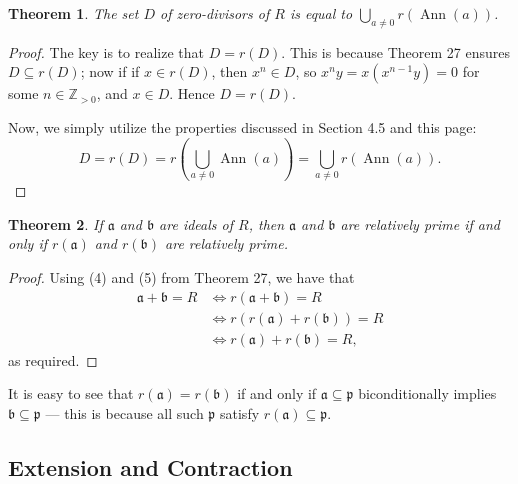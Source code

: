 \documentclass[11pt]{article}
\newtheorem{theorem}{Theorem}
\newcommand{\Ann}{\operatorname{Ann}}
\begin{document}
\begin{adjustwidth}{0.5cm}{}
	\begin{theorem}
		The set $D$ of zero-divisors of $R$ is equal to $\bigcup\limits_{a \ne 0} r(\Ann (a))$.
	\end{theorem}
	\begin{proof}
		The key is to realize that $D = r(D)$. This is because Theorem 27 ensures $D \subseteq r(D)$; now if if $x \in r(D)$, then $x^{n} \in D$, so $x^{n}y = x(x^{n - 1}y) = 0$ for some $n \in \mathbb{Z}_{> 0}$, and $x \in D$. Hence $D = r(D)$.

		Now, we simply utilize the properties discussed in Section 4.5 and this page:
		\[
			D = r(D) = r \left( \bigcup\limits_{a \ne 0} \Ann (a) \right) = \bigcup\limits_{a \ne 0} r (\Ann (a)).
		\]
	\end{proof}
\end{adjustwidth}

\begin{adjustwidth}{0.5cm}{}
	\begin{theorem}
		If $\mathfrak{a}$ and $\mathfrak{b}$ are ideals of $R$, then $\mathfrak{a}$ and $\mathfrak{b}$ are relatively prime if and only if $r(\mathfrak{a})$ and $r(\mathfrak{b})$ are relatively prime.
	\end{theorem}
	\begin{proof}
		Using (4) and (5) from Theorem 27, we have that
		\begin{align*}
			\mathfrak{a} + \mathfrak{b} = R &\iff r(\mathfrak{a} + \mathfrak{b}) = R \\
			&\iff r(r(\mathfrak{a}) + r(\mathfrak{b})) = R \\
			&\iff r(\mathfrak{a}) + r(\mathfrak{b}) = R,
		\end{align*}
		as required.
	\end{proof}
\end{adjustwidth}

It is easy to see that $r(\mathfrak{a}) = r(\mathfrak{b})$ if and only if $\mathfrak{a} \subseteq \mathfrak{p}$ biconditionally implies $\mathfrak{b} \subseteq \mathfrak{p}$ --- this is because all such $\mathfrak{p}$ satisfy $r(\mathfrak{a}) \subseteq \mathfrak{p}$.


\subsection{Extension and Contraction}
\end{document}

